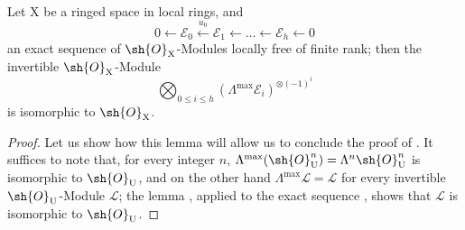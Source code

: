 \begin{lemma}[21.11.1.2]
\label{IV.21.11.1.2}
Let $\mathrm{X}$ be a ringed space in local rings, and
\[
  0\leftarrow\mathscr{E}_0\xleftarrow{u_0}\mathscr{E}_1\leftarrow\ldots\leftarrow\mathscr{E}_h\leftarrow 0
\]
an exact sequence of $\sh{O}_{\mathrm{X}}$-Modules locally free of finite rank; then the invertible $\sh{O}_{\mathrm{X}}$-Module
\[
  \bigotimes_{0\leq i\leq h}(\Lambda^{\max}\mathscr{E}_i)^{\otimes(-1)^i}
\]
is isomorphic to $\sh{O}_{\mathrm{X}}$.
\end{lemma}

\begin{proof}
Let us show how this lemma will allow us to conclude the proof of .
It suffices to note that, for every integer $n$, $\Lambda^{\max}(\sh{O}_{\mathrm{U}}^n)=\Lambda^n\sh{O}_{\mathrm{U}}^n$ is isomorphic to $\sh{O}_{\mathrm{U}}$, and on the other hand $\Lambda^{\max}\mathscr{L}=\mathscr{L}$ for every invertible $\sh{O}_{\mathrm{U}}$-Module $\mathscr{L}$; the lemma , applied to the exact sequence , shows that $\mathscr{L}$ is isomorphic to $\sh{O}_{\mathrm{U}}$.


\end{proof}
